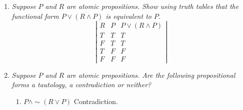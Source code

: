 \documentclass[10pt]{article}
\begin{document}
\begin{enumerate}
\begin{enumerate}
\[    \right\vert \]      
  \item $P \wedge R \wedge S$ 
    \[ \left\vert\begin{array}{cccc} 
        P & R & S & P \wedge R \wedge S \\
        T & T & T & T \\
        T & T & F & F \\
        T & F & T & F \\
        F & T & T & F \\
        F & F & T & F \\
        F & T & F & F \\
        T & F & F & F \\
        F & F & F & F
      \end{array}
    \right\vert \]
  \item $P \vee R \vee S$
    \[ \left\vert\begin{array}{cccc} 
        P & R & S & P \vee R \vee S \\
        T & T & T & T \\
        T & T & F & T \\
        T & F & T & T \\
        F & T & T & T \\
        F & F & T & T \\
        F & T & F & T \\
        T & F & F & T \\
        F & F & F & F
      \end{array}
    \right\vert \]
  \end{enumerate}
\item \textit{Suppose $P$ and $R$ are atomic propositions. Show using truth
    tables that the functional form $P \vee (R \wedge P)$ is
    equivalent to $P$.}
  \[ \left\vert\begin{array}{ccc} 
      R & P & P \vee (R \wedge P) \\
      T & T & T \\
      F & T & T \\
      T & F & F \\
      F & F & F 
    \end{array} \right\vert \]
\item \textit{Suppose $P$ and $R$ are atomic propositions. Are the following
    propositional forms a tautology, a contradiction or neither?}
  \begin{enumerate}
  \item $P\wedge \sim (R\vee P)$
    Contradiction. 

\end{enumerate}
\end{enumerate}
\end{document}
